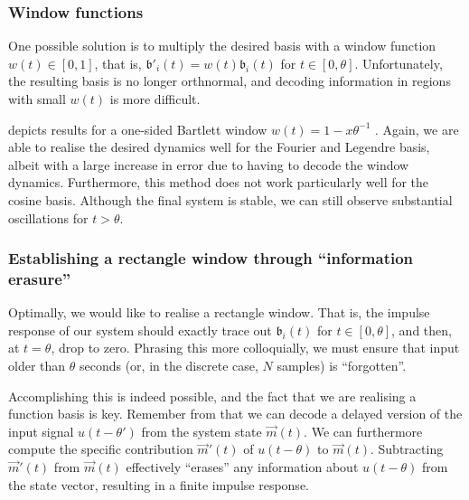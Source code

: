 \subsubsection{Window functions}
One possible solution is to multiply the desired basis with a window function $w(t) \in [0, 1]$, that is, $\mathfrak{b}'_i(t) = w(t) \mathfrak{b}_i(t)$ for $t \in [0, \theta]$.
Unfortunately, the resulting basis is no longer orthnormal, and decoding information in regions with small $w(t)$ is more difficult.

 depicts results for a one-sided Bartlett window $w(t) = 1 - x \theta^{-1}$ \citep[cf.][Section~7.5]{oppenheim2009discretetime}.
Again, we are able to realise the desired dynamics well for the Fourier and Legendre basis, albeit with a large increase in error due to having to decode the window dynamics.
Furthermore, this method does not work particularly well for the cosine basis.
Although the final system is stable, we can still observe substantial oscillations for $t > \theta$.

\subsubsection{Establishing a rectangle window through \enquote{information erasure}}
Optimally, we would like to realise a rectangle window.
That is, the impulse response of our system should exactly trace out $\mathfrak{b}_i(t)$ for $t \in [0, \theta]$, and then, at $t = \theta$, drop to zero.
Phrasing this more colloquially, we must ensure that input older than $\theta$ seconds (or, in the discrete case, $N$ samples) is \enquote{forgotten}.

Accomplishing this is indeed possible, and the fact that we are realising a function basis is key.
Remember from  that we can decode a delayed version of the input signal $u(t - \theta')$ from the system state $\vec m(t)$.
We can furthermore compute the specific contribution $\vec m'(t)$ of $u(t - \theta)$ to $\vec m(t)$.
Subtracting $\vec m'(t)$ from $\vec m(t)$ effectively \enquote{erases} any information about $u(t - \theta)$ from the state vector, resulting in a finite impulse response.

